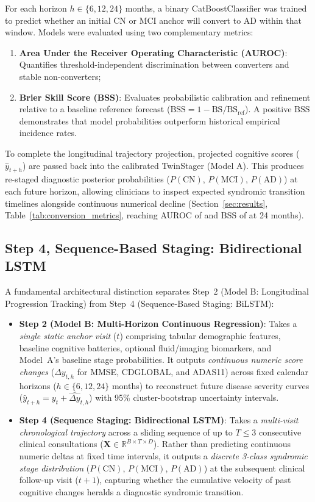 For each horizon $h \in \{6, 12, 24\}$ months, a binary CatBoostClassifier was trained to predict whether an initial CN or MCI anchor will convert to AD within that window. Models were evaluated using two complementary metrics:
\begin{enumerate}
    \item \textbf{Area Under the Receiver Operating Characteristic (AUROC)}: Quantifies threshold-independent discrimination between converters and stable non-converters;
    \item \textbf{Brier Skill Score (BSS)}: Evaluates probabilistic calibration and refinement relative to a baseline reference forecast ($\text{BSS} = 1 - \text{BS} / \text{BS}_{\text{ref}}$). A positive BSS demonstrates that model probabilities outperform historical empirical incidence rates.
\end{enumerate}

To complete the longitudinal trajectory projection, projected cognitive scores ($\hat{y}_{t+h}$) are passed back into the calibrated TwinStager (Model A). This produces re-staged diagnostic posterior probabilities ($P(\text{CN})$, $P(\text{MCI})$, $P(\text{AD})$) at each future horizon, allowing clinicians to inspect expected syndromic transition timelines alongside continuous numerical decline (Section~\ref{sec:results}, Table~\ref{tab:conversion_metrics}, reaching AUROC of \ConvAUCXXIV{} and BSS of \ConvBSSXXIV{} at 24 months).

\subsection{Step 4, Sequence-Based Staging: Bidirectional LSTM}
\label{sec:bilstm_methodology}
A fundamental architectural distinction separates Step~2 (Model B: Longitudinal Progression Tracking) from Step~4 (Sequence-Based Staging: BiLSTM):
\begin{itemize}
    \item \textbf{Step 2 (Model B: Multi-Horizon Continuous Regression)}: Takes a \textit{single static anchor visit} ($t$) comprising tabular demographic features, baseline cognitive batteries, optional fluid/imaging biomarkers, and Model~A's baseline stage probabilities. It outputs \textit{continuous numeric score changes} ($\Delta y_{t,h}$ for MMSE, CDGLOBAL, and ADAS11) across fixed calendar horizons ($h \in \{6, 12, 24\}$ months) to reconstruct future disease severity curves ($\hat{y}_{t+h} = y_t + \widehat{\Delta y}_{t,h}$) with 95\% cluster-bootstrap uncertainty intervals.
    \item \textbf{Step 4 (Sequence Staging: Bidirectional LSTM)}: Takes a \textit{multi-visit chronological trajectory} across a sliding sequence of up to $T \le 3$ consecutive clinical consultations ($\mathbf{X} \in \mathbb{R}^{B \times T \times D}$). Rather than predicting continuous numeric deltas at fixed time intervals, it outputs a \textit{discrete 3-class syndromic stage distribution} ($P(\text{CN})$, $P(\text{MCI})$, $P(\text{AD})$) at the subsequent clinical follow-up visit ($t+1$), capturing whether the cumulative velocity of past cognitive changes heralds a diagnostic syndromic transition.
\end{itemize}

